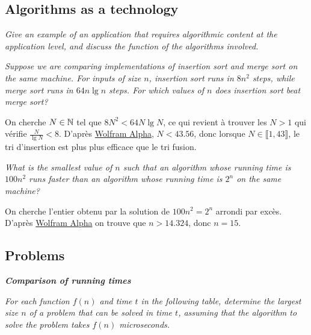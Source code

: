 \subsection{Algorithms as a technology}

\begin{description}
   {\itshape Give an example of an application that requires algorithmic content at the application level, and discuss the function of the algorithms involved.}

    \begin{exrev}
      
    \end{exrev}

   {\itshape Suppose we are comparing implementations of insertion sort and merge sort on the same machine. For inputs of size $n$, insertion sort runs in $8n^2$ steps, while merge sort runs in $64n\lg n$ steps. For which values of $n$ does insertion sort beat merge sort?}

    \begin{ex}
      On cherche $N \in \mathbb{N}$ tel que $8N^2 < 64N\lg N$, ce qui revient \`a trouver les $N > 1$ qui v\'erifie $\frac{N}{\lg N} < 8$. D'apr\`es \href{https://www.wolframalpha.com/input/?i=N%2Flog_2(N)+%3C+8}{Wolfram Alpha}, $N < 43.56$, donc lorsque $N\in\llbracket 1,43  \rrbracket$, le tri d'insertion est plus plus efficace que le tri fusion.
    \end{ex}

   {\itshape What is the smallest value of $n$ such that an algorithm whose running time is $100n^2$ runs faster than an algorithm whose running time is $2^n$ on the same machine?}

    \begin{ex}
      On cherche l'entier obtenu par la solution de $100n^2 = 2^n $ arrondi par exc\`es. D'apr\`es \href{https://www.wolframalpha.com/input/?i=100*n%5E2+%3C+2%5En}{Wolfram Alpha} on trouve que $n > 14.324$, donc $n=15$.
    \end{ex}  

\end{description}

\subsection{Problems} 

\begin{description}
   \textbf{\itshape Comparison of running times}

    {\itshape For each function $f(n)$ and time $t$ in the following table, determine the largest size $n$ of a problem that can be solved in time $t$, assuming that the algorithm to solve the problem takes $f(n)$ microseconds.}

    \begin{pbrev}
      
    \end{pbrev}


\end{description}

